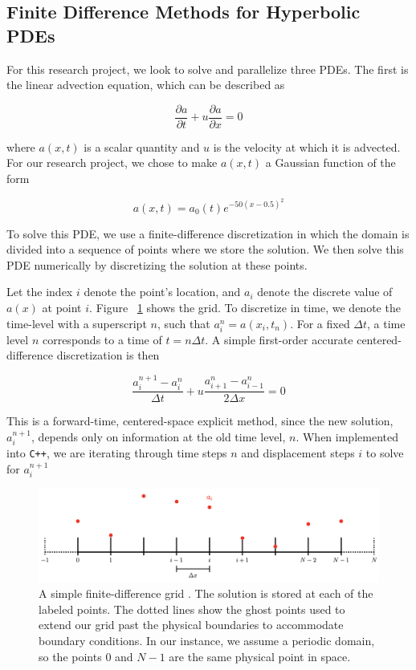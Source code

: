 \documentclass{article}
\begin{document}
\subsection{Finite Difference Methods for Hyperbolic PDEs}
For this research project, we look to solve and parallelize three PDEs. The first is the linear advection equation, which can be described as 

\begin{equation}
 \frac{\partial a}{\partial t} + u \frac{\partial a}{\partial x} = 0
\end{equation}

where $a(x,t)$ is a scalar quantity and $u$ is the velocity at which it is advected. For our research project, we chose to make $a(x,t)$ a Gaussian function of the form 

\begin{equation}
a(x,t) = a_0(t) e^{- 50 (x - 0.5)^2 }
\end{equation}

To solve this PDE, we use a finite-difference discretization in which the domain is divided into a sequence of points where we store the solution. We then solve this PDE numerically by discretizing the solution at these points.



Let the index $i$ denote the point's location, and $a_i$ denote the discrete value of $a(x)$ at point $i$. Figure ~\ref{Finite_Difference_Grid} shows the grid. To discretize in time, we denote the time-level with a superscript $n$, such that $a_i^n = a(x_i, t_n)$. For a fixed $\Delta t$, a time level $n$ corresponds to a time of $t = n \Delta t$. A simple first-order accurate centered-difference discretization is then

\begin{equation}
 \frac{a_i^{n+1} - a_i^n}{\Delta t} + u \frac{a_{i+1}^n - a_{i-1}^n}{2 \Delta x}  = 0
\end{equation}

This is a forward-time, centered-space explicit method, since the new solution, $a_i^{n+1}$, depends only on information at the old time level, $n$. When implemented into \texttt{C++}, we are iterating through time steps $n$ and displacement steps $i$ to solve for $a_i^{n+1} $

\begin{figure}[h]
\centering
\includegraphics[width=1.0\textwidth]{Images/Finite_Difference_Grid.png}
\caption{A simple finite-difference grid \cite{zingale_2020}. The solution is stored at each of the labeled points. The dotted lines show the ghost points used to extend our grid past the physical boundaries to accommodate boundary conditions. In our instance, we assume a periodic domain, so the points $0$ and $N-1$ are the same physical point in space.}
\label{Finite_Difference_Grid}
\end{figure}
\end{document}
